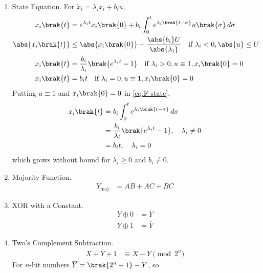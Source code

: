 \begin{enumerate}[label=\thesubsection.\arabic*, ref=\thesubsection.\theenumi]
\begin{align}
T &= \frac{\sum_{k} P_k \Delta_k}{\Delta}
\label{eq:F-mason}
\\
\Delta &= 1 - \sum_{i} L_i + \cdots
\end{align}
where $P_k$ are the forward-path gains, $L_i$ the loop gains and $\Delta_k$ is $\Delta$ with the loops touching path $k$ removed.
\item State Equation. For $\dot{x}_i = \lambda_i x_i + b_i u$,
\begin{align}
x_i\brak{t} &= e^{\lambda_i t} x_i\brak{0} + b_i \int_{0}^{t} e^{\lambda_i \brak{t - \sigma}} u\brak{\sigma} \,d\sigma
\label{eq:F-state}
\\
\abs{x_i\brak{t}} &\le \abs{x_i\brak{0}} + \frac{\abs{b_i} U}{\abs{\lambda_i}} \quad \text{if } \lambda_i < 0, \abs{u} \le U
\label{eq:F-state-bounded}
\\
x_i\brak{t} &= \frac{b_i}{\lambda_i}\brak{e^{\lambda_i t} - 1} \quad \text{if } \lambda_i > 0, u \equiv 1, x_i\brak{0} = 0
\label{eq:F-state-unbounded}
\\
x_i\brak{t} &= b_i t \quad \text{if } \lambda_i = 0, u \equiv 1, x_i\brak{0} = 0
\label{eq:F-state-integrator}
\end{align}
\solution Putting $u \equiv 1$ and $x_i\brak{0} = 0$ in \eqref{eq:F-state},
\begin{align}
x_i\brak{t} &= b_i \int_{0}^{t} e^{\lambda_i \brak{t - \sigma}} \,d\sigma
\\
&= \frac{b_i}{\lambda_i}\brak{e^{\lambda_i t} - 1}, \quad \lambda_i \ne 0
\\
&= b_i t, \quad \lambda_i = 0
\end{align}
which grows without bound for $\lambda_i \ge 0$ and $b_i \ne 0$.
\item Majority Function.
\begin{align}
Y_{\mathrm{maj}} &= AB + AC + BC
\label{eq:F-maj}
\end{align}
\item XOR with a Constant.
\begin{align}
Y \oplus 0 &= Y
\\
Y \oplus 1 &= \overline{Y}
\label{eq:F-xor}
\end{align}
\item Two's Complement Subtraction.
\begin{align}
X + \overline{Y} + 1 &\equiv X - Y \pmod{2^n}
\label{eq:F-twos}
\end{align}
\solution For $n$-bit numbers $\overline{Y} = \brak{2^n - 1} - Y$, so
\begin{align}

\end{align}
\end{enumerate}

